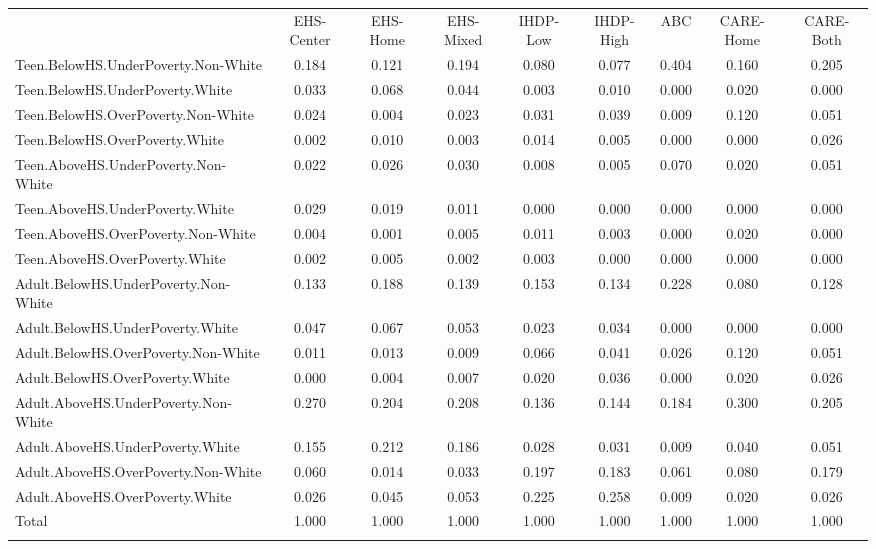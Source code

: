 \begin{tabular}{lcccccccc}
\hline \noalign{\smallskip} & EHS-Center & EHS-Home & EHS-Mixed & IHDP-Low & IHDP-High & ABC & CARE-Home & CARE-Both\\
\noalign{\smallskip}\hline \noalign{\smallskip}Teen.BelowHS.UnderPoverty.Non-White & 0.184 & 0.121 & 0.194 & 0.080 & 0.077 & 0.404 & 0.160 & 0.205\\
Teen.BelowHS.UnderPoverty.White & 0.033 & 0.068 & 0.044 & 0.003 & 0.010 & 0.000 & 0.020 & 0.000\\
Teen.BelowHS.OverPoverty.Non-White & 0.024 & 0.004 & 0.023 & 0.031 & 0.039 & 0.009 & 0.120 & 0.051\\
Teen.BelowHS.OverPoverty.White & 0.002 & 0.010 & 0.003 & 0.014 & 0.005 & 0.000 & 0.000 & 0.026\\
Teen.AboveHS.UnderPoverty.Non-White & 0.022 & 0.026 & 0.030 & 0.008 & 0.005 & 0.070 & 0.020 & 0.051\\
Teen.AboveHS.UnderPoverty.White & 0.029 & 0.019 & 0.011 & 0.000 & 0.000 & 0.000 & 0.000 & 0.000\\
Teen.AboveHS.OverPoverty.Non-White & 0.004 & 0.001 & 0.005 & 0.011 & 0.003 & 0.000 & 0.020 & 0.000\\
Teen.AboveHS.OverPoverty.White & 0.002 & 0.005 & 0.002 & 0.003 & 0.000 & 0.000 & 0.000 & 0.000\\
Adult.BelowHS.UnderPoverty.Non-White & 0.133 & 0.188 & 0.139 & 0.153 & 0.134 & 0.228 & 0.080 & 0.128\\
Adult.BelowHS.UnderPoverty.White & 0.047 & 0.067 & 0.053 & 0.023 & 0.034 & 0.000 & 0.000 & 0.000\\
Adult.BelowHS.OverPoverty.Non-White & 0.011 & 0.013 & 0.009 & 0.066 & 0.041 & 0.026 & 0.120 & 0.051\\
Adult.BelowHS.OverPoverty.White & 0.000 & 0.004 & 0.007 & 0.020 & 0.036 & 0.000 & 0.020 & 0.026\\
Adult.AboveHS.UnderPoverty.Non-White & 0.270 & 0.204 & 0.208 & 0.136 & 0.144 & 0.184 & 0.300 & 0.205\\
Adult.AboveHS.UnderPoverty.White & 0.155 & 0.212 & 0.186 & 0.028 & 0.031 & 0.009 & 0.040 & 0.051\\
Adult.AboveHS.OverPoverty.Non-White & 0.060 & 0.014 & 0.033 & 0.197 & 0.183 & 0.061 & 0.080 & 0.179\\
Adult.AboveHS.OverPoverty.White & 0.026 & 0.045 & 0.053 & 0.225 & 0.258 & 0.009 & 0.020 & 0.026\\
Total & 1.000 & 1.000 & 1.000 & 1.000 & 1.000 & 1.000 & 1.000 & 1.000\\
\noalign{\smallskip}\hline\end{tabular}\\
